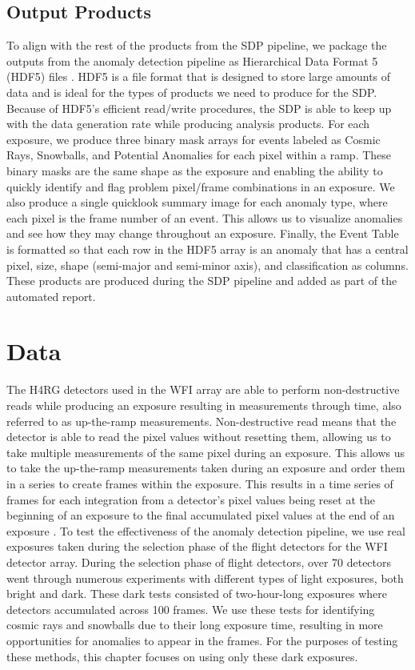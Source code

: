 \subsection{Output Products}
To align with the rest of the products from the SDP pipeline, we package the outputs from the anomaly detection pipeline as Hierarchical Data Format 5 (HDF5) files \parencite{The_HDF_Group_Hierarchical_Data_Format}.
HDF5 is a file format that is designed to store large amounts of data and is ideal for the types of products we need to produce for the SDP.
Because of HDF5's efficient read/write procedures, the SDP is able to keep up with the data generation rate while producing analysis products. 
For each exposure, we produce three binary mask arrays for events labeled as Cosmic Rays, Snowballs, and Potential Anomalies for each pixel within a ramp. 
These binary masks are the same shape as the exposure and enabling the ability to quickly identify and flag problem pixel/frame combinations in an exposure. 
We also produce a single quicklook summary image for each anomaly type, where each pixel is the frame number of an event. 
This allows us to visualize anomalies and see how they may change throughout an exposure.
Finally, the Event Table is formatted so that each row in the HDF5 array is an anomaly that has a central pixel, size, shape (semi-major and semi-minor axis), and classification as columns. 
These products are produced during the SDP pipeline and added as part of the automated report. 

\section{Data}
\label{rst/sec:data}
The H4RG detectors used in the WFI array are able to perform non-destructive reads while producing an exposure resulting in measurements through time, also referred to as up-the-ramp measurements. 
Non-destructive read means that the detector is able to read the pixel values without resetting them, allowing us to take multiple measurements of the same pixel during an exposure.
This allows us to take the up-the-ramp measurements taken during an exposure and order them in a series to create frames within the exposure. 
This results in a time series of frames for each integration from a detector's pixel values being reset at the beginning of an exposure to the final accumulated pixel values at the end of an exposure \parencite{casertano2022determining}.
To test the effectiveness of the anomaly detection pipeline, we use real exposures taken during the selection phase of the flight detectors for the WFI detector array. 
During the selection phase of flight detectors, over 70 detectors went through numerous experiments with different types of light exposures, both bright and dark.
These dark tests consisted of two-hour-long exposures where detectors accumulated across 100 frames.
We use these tests for identifying cosmic rays and snowballs due to their long exposure time, resulting in more opportunities for anomalies to appear in the frames. 
For the purposes of testing these methods, this chapter focuses on using only these dark exposures. 

